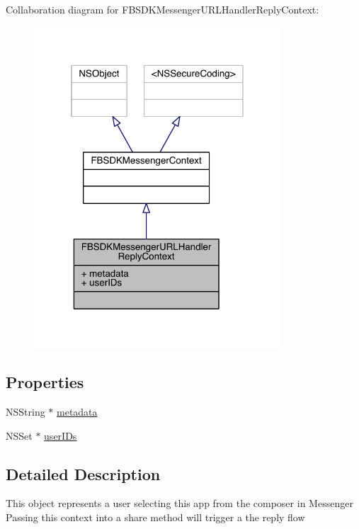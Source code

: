 Collaboration diagram for F\-B\-S\-D\-K\-Messenger\-U\-R\-L\-Handler\-Reply\-Context\-:
\nopagebreak
\begin{figure}[H]
\begin{center}
\leavevmode
\includegraphics[width=261pt]{interface_f_b_s_d_k_messenger_u_r_l_handler_reply_context__coll__graph}
\end{center}
\end{figure}
\subsection*{Properties}
\begin{DoxyCompactItemize}
\item 
N\-S\-String $\ast$ \hyperlink{interface_f_b_s_d_k_messenger_u_r_l_handler_reply_context_a6c5f74a436e2dbf6443853c9a64b725f}{metadata}
\item 
N\-S\-Set $\ast$ \hyperlink{interface_f_b_s_d_k_messenger_u_r_l_handler_reply_context_ad90f842303b7d910f85ab8996294c011}{user\-I\-Ds}
\end{DoxyCompactItemize}


\subsection{Detailed Description}
This object represents a user selecting this app from the composer in Messenger Passing this context into a share method will trigger a the reply flow

